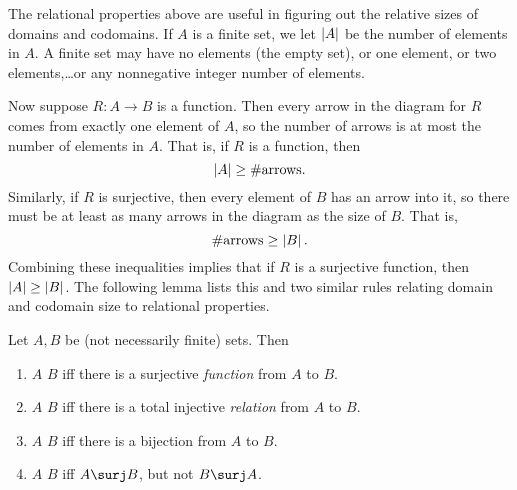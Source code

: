 \label{mappingrule_sec}

The relational properties above are useful in figuring out the relative
sizes of domains and codomains.  If $A$ is a finite set, we let $\left|A\right|$
be the number of elements in $A$.  A finite set may have no elements (the
empty set), or one element, or two elements,\dots or any nonnegative
integer number of elements.

Now suppose $R:A \to B$ is a function.  Then every arrow in the diagram
for $R$ comes from exactly one element of $A$, so the number of arrows is
at most the number of elements in $A$.  That is, if $R$ is a function,
then
\[
\left|A\right| \geq \#\text{arrows}.
\]
Similarly, if $R$ is surjective, then every element of $B$ has an arrow
into it, so there must be at least as many arrows in the diagram as the
size of $B$.  That is,
\[
\#\text{arrows} \geq \left|B\right|.
\]
Combining these inequalities implies that if $R$ is a surjective function,
then $\left|A\right| \geq \left|B\right|$.  The following lemma lists this and two
similar rules relating domain and codomain size to relational properties.

\begin{definition}\label{bigger}
  Let $A,B$ be (not necessarily finite) sets.  Then
  \begin{enumerate}
  \item $A$ \term{$\surj$} $B$ iff there is a surjective \emph{function} from $A$ to $B$.  

  \item $A$ \term{$\inj$} $B$ iff there is a total injective \emph{relation} from $A$ to $B$.

  \item $A$ \term{$\bij$} $B$ iff there is a bijection from $A$ to $B$.  

  \item $A$ \term{$\strict$} $B$ iff $A \surj B$, but not $B \surj A$.  

  \end{enumerate}
\end{definition}


